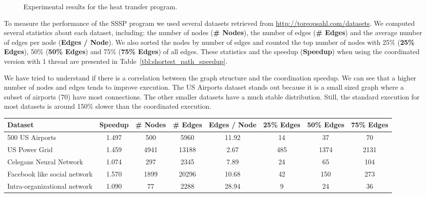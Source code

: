 \begin{figure}[h!]
     \centering
   \caption{Experimental results for the heat transfer program.}
   \label{exp:heat-transfer}
\end{figure}

To measure the performance of the SSSP program we used several datasets retrieved from \url{http://toreopsahl.com/datasets}. We computed several
statistics about each dataset, including: the number of nodes (\textbf{\# Nodes}), the number of edges (\textbf{\# Edges}) and
the average number of edges per node (\textbf{Edges / Node}). We also sorted the nodes by number of edges and counted the top number of nodes
with 25\% (\textbf{25\% Edges}), 50\% (\textbf{50\% Edges}) and 75\% (\textbf{75\% Edges}) of all edges.
These statistics and the speedup (\textbf{Speedup}) when using the coordinated version with 1 thread are presented in Table~\ref{tbl:shortest_path_speedup}.

We have tried to understand if there is a correlation between the graph structure and the coordination speedup. We can see that a higher number
of nodes and edges tends to improve execution. The US Airports dataset stands out because it is a small sized graph where a subset of airports
(70) have most connections. The other smaller datasets have a much stable distribution.
Still, the standard execution for most datasets is around 150\% slower than the coordinated execution.

\begin{table*}[ht]
   
\begin{center}
    \begin{tabular}{| l | c | c | c | c | c | c | c |}
    \hline
    \textbf{Dataset} & \textbf{Speedup} & \textbf{\# Nodes} & \textbf{\# Edges} & \textbf{Edges / Node} & \textbf{25\% Edges} & \textbf{50\% Edges} & \textbf{75\% Edges} \\ \hline \hline
    500 US Airports & 1.497 & 500 & 5960 & 11.92 & 14 & 37 & 70 \\ \hline
    US Power Grid & 1.459 & 4941 & 13188 & 2.67 & 485 & 1374 & 2131 \\ \hline
    Celegans Neural Network & 1.074 & 297 & 2345 & 7.89 & 24 & 65 & 104 \\ \hline
    Facebook like social network & 1.570 & 1899 & 20296 & 10.68 & 42 & 150 & 273 \\ \hline
    Intra-organizational network & 1.090 & 77 & 2288 & 28.94 & 9 & 24 & 36 \\ \hline
    \end{tabular}
\end{center}
     \caption{Summarized information about the datasets used in the SSSP program.}
     \label{tbl:shortest_path_speedup}
\end{table*}

